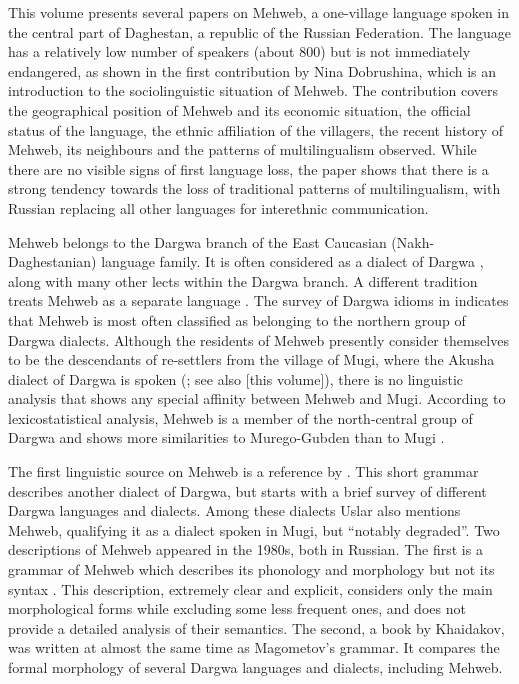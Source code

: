 

\begin{refsection}
This volume presents several papers on Mehweb, a one-village language
spoken in the central part of Daghestan, a republic of the Russian
Federation. The language has a relatively low number of speakers (about
800) but is not immediately endangered, as shown in the first
contribution by Nina Dobrushina, which is an introduction to the
sociolinguistic situation of Mehweb. The contribution covers the
geographical position of Mehweb and its economic situation, the official
status of the language, the ethnic affiliation of the villagers, the recent
history of Mehweb, its neighbours and the patterns of multilingualism observed.
While there are no visible signs of first language loss, the paper shows
that there is a strong tendency towards the loss of traditional patterns
of multilingualism, with Russian replacing all other languages for
interethnic communication.

Mehweb belongs to the Dargwa branch of the East Caucasian
(Nakh-Daghe\-stanian) language family. It is often considered as a dialect
of Dargwa \citep{magometov1982}, along with many other lects within the
Dargwa branch. A different tradition treats Mehweb as a separate
language \citep{khajdakov1985, koryakov-sumbatova2007}. The survey of
Dargwa idioms in \citet{sumbatova-lander2014} indicates that Mehweb is most
often classified as belonging to the northern group of Dargwa dialects.
Although the residents of Mehweb presently consider themselves to be the
descendants of re-settlers from the village of Mugi, where the Akusha
dialect of Dargwa is spoken (\citealt{uslar1892}; see also \citealt{dobrushina2019} [this volume]), there is no linguistic analysis that shows any special affinity
between Mehweb and Mugi. According to lexicostatistical analysis, Mehweb
is a member of the north-central group of Dargwa and shows more
similarities to Murego-Gubden than to Mugi \citep{koryakov2013}.

The first linguistic source on Mehweb is a reference by \citet{uslar1892}.
This short grammar describes another dialect of Dargwa, but
starts with a brief survey of different Dargwa languages and dialects.
Among these dialects Uslar also mentions Mehweb, qualifying it as a
dialect spoken in Mugi, but ``notably degraded''. Two descriptions of
Mehweb appeared in the 1980s, both in Russian. The first is a
grammar of Mehweb which describes its phonology and morphology but not
its syntax \citep{magometov1982}. This description, extremely clear and explicit,
considers only the main morphological forms while excluding some less frequent ones,
and does not provide a detailed analysis of their semantics. The second, 
a book by Khaidakov, was written at almost the same time as
Magometov's grammar. It compares the formal morphology of several Dargwa
languages and dialects, including Mehweb.


\end{refsection}
